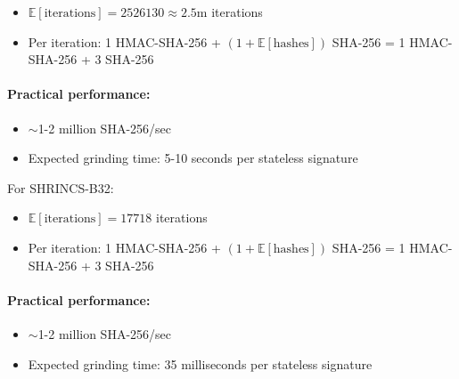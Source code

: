 \begin{itemize}
    \item $\mathbb{E}[\text{iterations}] = 2526130 \approx 2.5$m iterations
    \item Per iteration: 1 HMAC-SHA-256 + $(1 + \mathbb{E}[\text{hashes}])$ SHA-256 = 1 HMAC-SHA-256 + 3 SHA-256  
\end{itemize}

\paragraph{Practical performance:}
\begin{itemize}
    \item $\sim$1-2 million SHA-256/sec
    \item Expected grinding time: 5-10 seconds per stateless signature
\end{itemize}

For SHRINCS-B32:

\begin{itemize}
    \item $\mathbb{E}[\text{iterations}] = 17718$ iterations
    \item Per iteration: 1 HMAC-SHA-256 + $(1 + \mathbb{E}[\text{hashes}])$ SHA-256 = 1 HMAC-SHA-256 + 3 SHA-256
\end{itemize}

\paragraph{Practical performance:}
\begin{itemize}
    \item $\sim$1-2 million SHA-256/sec
    \item Expected grinding time: 35 milliseconds per stateless signature
\end{itemize}